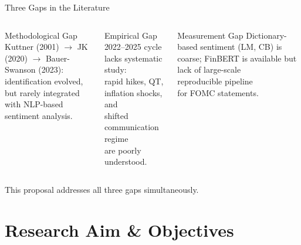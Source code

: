 \documentclass[aspectratio=169, 11pt]{beamer}
\begin{document}
\begin{frame}{Three Gaps in the Literature}
  \begin{columns}[T]
    \begin{fblock}[4.2cm]{Methodological Gap}
      \footnotesize
      Kuttner (2001) $\to$ JK (2020) $\to$ Bauer-Swanson (2023): \\
      identification evolved, but \alert{rarely integrated} with NLP-based \\
      sentiment analysis.
    \end{fblock}

    \begin{falertblock}[4.2cm]{Empirical Gap}
      \footnotesize
      2022--2025 cycle lacks systematic study: \\
      rapid hikes, QT, inflation shocks, and \\
      \alert{shifted communication regime} \\
      are poorly understood.
    \end{falertblock}

    \begin{fblock}[4.2cm]{Measurement Gap}
      \footnotesize
      Dictionary-based sentiment (LM, CB) is coarse; FinBERT is available but \alert{lack of large-scale \\
      reproducible pipeline} \\
      for FOMC statements.
    \end{fblock}
  \end{columns}

  \vspace{0.4em}
  \begin{center}
    \small This proposal addresses all three gaps simultaneously.
  \end{center}
\end{frame}

\section{Research Aim \& Objectives}
\end{document}
